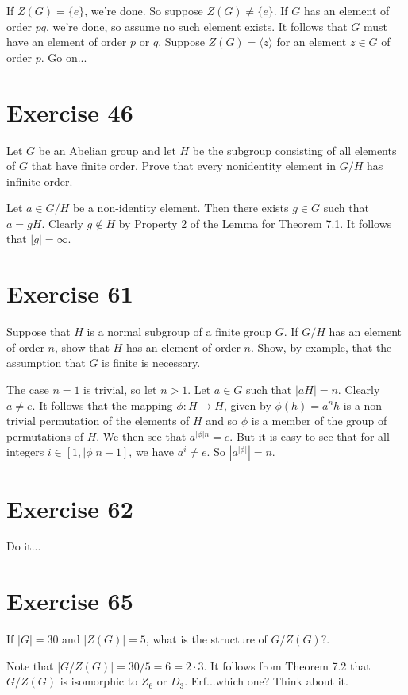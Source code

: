 \documentclass[12pt]{article}
\begin{document}
If $Z(G)=\{e\}$, we're done.  So suppose $Z(G)\neq\{e\}$.
If $G$ has an element of order $pq$, we're done,
so assume no such element exists.  It follows that
$G$ must have an element of order $p$ or $q$.  Suppose
$Z(G)=\langle z\rangle$ for an element $z\in G$ of
order $p$.  Go on...

\section*{Exercise 46}

Let $G$ be an Abelian group and let $H$ be the subgroup consisting
of all elements of $G$ that have finite order.  Prove that every nonidentity
element in $G/H$ has infinite order.

Let $a\in G/H$ be a non-identity element.  Then there exists $g\in G$ such
that $a=gH$.  Clearly $g\not\in H$ by Property 2 of the Lemma for Theorem 7.1.
It follows that $|g|=\infty$.

\section*{Exercise 61}

Suppose that $H$ is a normal subgroup of a finite group $G$.
If $G/H$ has an element of order $n$, show that $H$ has an element of order $n$.
Show, by example, that the assumption that $G$ is finite is necessary.

The case $n=1$ is trivial, so let $n>1$.  Let $a\in G$ such that $|aH|=n$.  Clearly $a\neq e$.
It follows that the mapping $\phi:H\to H$, given by $\phi(h)=a^nh$ is a non-trivial permutation of
the elements of $H$ and so $\phi$ is a member of the group of permutations of $H$.
We then see that $a^{|\phi|n}=e$.  But it is easy to see that for all
integers $i\in [1,|\phi|n-1]$, we have $a^i\neq e$.  So $|a^{|\phi|}|=n$.

\section*{Exercise 62}

Do it...

\section*{Exercise 65}

If $|G|=30$ and $|Z(G)|=5$, what is the
structure of $G/Z(G)?$.

Note that $|G/Z(G)|=30/5=6=2\cdot 3$.
It follows from Theorem 7.2 that $G/Z(G)$
is isomorphic to $Z_6$ or $D_3$.  Erf...which one?
Think about it.
\end{document}
